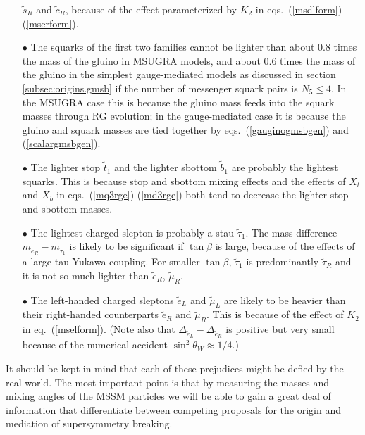 \documentclass[11pt]{article}
\def\stilde{\widetilde}
\def\nmess{N_5}
\begin{document}
\begin{itemize}
$\stilde s_R$ and $\stilde c_R$, because of the effect parameterized
by $K_2$ in eqs.~(\ref{msdlform})-(\ref{mserform}).
%
\item[$\bullet$] The squarks of the first two families cannot be lighter 
than about 0.8 times the mass of the gluino in MSUGRA 
models, and about 0.6 times the mass of the gluino in the simplest 
gauge-mediated models as discussed in section \ref{subsec:origins.gmsb} if 
the number of messenger squark pairs is $\nmess \leq 4$.
In the MSUGRA case this is because the gluino mass feeds
into the squark masses through RG evolution; in the gauge-mediated case it
is because the gluino and squark masses are tied together by
eqs.~(\ref{gauginogmsbgen}) and (\ref{scalargmsbgen}). 
%
\item[$\bullet$] The lighter stop $\stilde t_1$ and the lighter sbottom 
$\stilde b_1$ are probably the lightest squarks. This is because stop and 
sbottom mixing effects and the effects of $X_t$ and $X_b$ in 
eqs.~(\ref{mq3rge})-(\ref{md3rge}) both tend to decrease the lighter stop 
and sbottom masses.
%
\item[$\bullet$] The lightest charged slepton is probably a stau $\stilde 
\tau_1$. The mass difference $m_{\tilde e_R}-m_{\tilde \tau_1}$ is 
likely to be significant if $\tan\beta$ is large, because of the effects 
of a large tau Yukawa coupling. For smaller $\tan\beta$, $\stilde \tau_1$ 
is predominantly $\stilde \tau_R$ and it is not so much lighter than 
$\stilde e_R$, $\stilde \mu_R$.
%
\item[$\bullet$] The left-handed charged sleptons $\stilde e_L$ and 
$\stilde \mu_L$ are likely to be heavier than their right-handed 
counterparts $\stilde e_R$ and $\stilde \mu_R$. This is because of the 
effect of $K_2$ in eq.~(\ref{mselform}). (Note also that $\Delta_{\tilde 
e_L} - \Delta_{\tilde e_R}$ is positive but very small because of the 
numerical accident $\sin^2\theta_W \approx 1/4$.)
%
\end{itemize}
It should be kept in mind that each of these prejudices 
might be defied by the real world.
The most important point is that by measuring the masses and mixing angles 
of the MSSM particles we will be able to gain a great deal of information 
that differentiate between competing proposals for the 
origin and mediation of supersymmetry breaking.

\end{document}
